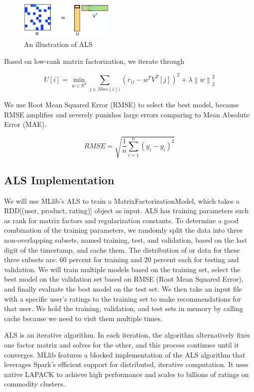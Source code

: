\documentclass[conference]{IEEEtran}
\begin{document}
\begin{figure}[h]
\centering
\includegraphics[width=0.4\textwidth]{image/als-illustration.png}
\caption{An illustration of ALS}
\end{figure}


Based on low-rank matrix factorization, we iterate through

$$U[i] = \min_{w \in \mathbb{R}^d} \sum_{j \in Nbrs(i))} (r_{ij} - w^TV^T[j])^2 + \lambda \left \| w \right \|^2_2$$


We use Root Mean Squared Error (RMSE) to select the best model, because RMSE amplifies and severely punishes large errors comparing to Mean Absolute Error (MAE). 

$$RMSE = \sqrt{\frac{1}{n} \sum_{i=1}^{n}(y_i - \hat{y_i})^2}$$

\subsection{ALS Implementation}

We will use MLlib’s ALS to train a MatrixFactorizationModel, which takes a RDD[(user, product, rating)] object as input. ALS has training parameters such as rank for matrix factors and regularization constants. To determine a good combination of the training parameters, we randomly split the data into three non-overlapping subsets, named training, test, and validation, based on the last digit of the timestamp, and cache them.  The distribution of or data for these three subsets are: 60 percent for training and 20 percent each for testing and validation.  We will train multiple models based on the training set, select the best model on the validation set based on RMSE (Root Mean Squared Error), and finally evaluate the best model on the test set. We then take an input file with a specific user's ratings to the training set to make recommendations for that user. We hold the training, validation, and test sets in memory by calling cache because we need to visit them multiple times.

ALS is an iterative algorithm. In each iteration, the algorithm alternatively fixes one factor matrix and solves for the other, and this process continues until it converges. MLlib features a blocked implementation of the ALS algorithm that leverages Spark’s efficient support for distributed, iterative computation. It uses native LAPACK to achieve high performance and scales to billions of ratings on commodity clusters. 
\end{document}
